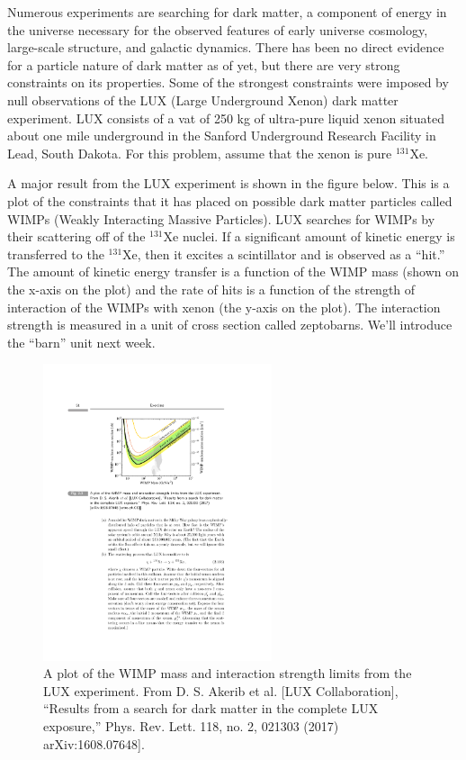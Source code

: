 {Numerous experiments are searching for dark matter, a component of energy in the universe necessary for the observed features of early universe cosmology, large-scale structure, and galactic dynamics. 
There has been no direct evidence for a particle nature of dark matter as of yet, but there are very strong constraints on its properties. 
Some of the strongest constraints were imposed by null observations of the LUX (Large Underground Xenon) dark matter experiment. 
LUX consists of a vat of 250 kg of ultra-pure liquid xenon situated about one mile underground in the Sanford Underground Research Facility in Lead, South Dakota. 
For this problem, assume that the xenon is pure $^{131}$Xe.

A major result from the LUX experiment is shown in the figure below. 
This is a plot of the constraints that it has placed on possible dark matter particles called WIMPs (Weakly Interacting Massive Particles). 
LUX searches for WIMPs by their scattering off of the $^{131}$Xe nuclei. 
If a significant amount of kinetic energy is transferred to the $^{131}$Xe, then it excites a scintillator and is observed as a ``hit.''
The amount of kinetic energy transfer is a function of the WIMP mass (shown on the x-axis on the plot) and the rate of hits is a function of the strength of interaction of the WIMPs with xenon (the y-axis on the plot). 
The interaction strength is measured in a unit of cross section called zeptobarns.
We’ll introduce the ``barn'' unit next week. 


\begin{figure}[h]
\centering
\includegraphics[width=0.6\textwidth]{./LuxLimits.pdf}
\caption{A plot of the WIMP mass and interaction strength limits from the LUX experiment. From D. S. Akerib et al. [LUX Collaboration], “Results from a search for dark matter in the complete LUX exposure,” Phys. Rev. Lett. 118, no. 2, 021303 (2017) arXiv:1608.07648].
}
\end{figure}


}
